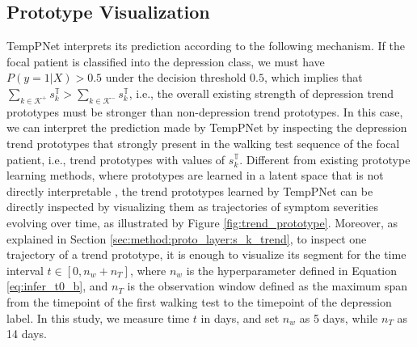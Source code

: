 \documentclass[mnsc]{informs3b} %
\begin{document}
\subsection{Prototype Visualization} \label{sec:method:proto_viz}

TempPNet interprets its prediction according to the following mechanism. If the focal patient is classified into the depression class, 
we must have $P(y=1|X) > 0.5$ under the decision threshold $0.5$, which implies that $\sum_{k \in \mathcal{K}^{+}} s_k^{\mathbb{T}} > \sum_{k \in \mathcal{K}^{-}} s_k^{\mathbb{T}}$, i.e., 
the overall existing strength of depression trend prototypes must be stronger than non-depression trend prototypes. 
In this case, we can interpret the prediction made by TempPNet by inspecting the depression trend prototypes that strongly present in the walking test sequence of the focal patient, i.e., trend prototypes with values of $s_k^{\mathbb{T}}$.
Different from existing prototype learning methods, where prototypes are learned in a latent space that is not directly interpretable \citep{chen_this_2019}, the trend prototypes learned by TempPNet can be directly inspected by visualizing them as trajectories of symptom severities evolving over time, as illustrated by Figure \ref{fig:trend_prototype}. Moreover, as explained in Section \ref{sec:method:proto_layer:s_k_trend}, to inspect one trajectory of a trend prototype, it is enough to visualize its segment for the time interval $t\in [0, n_w+n_T]$, where $n_w$ is the hyperparameter defined in Equation \ref{eq:infer_t0_b}, and $n_T$ is the observation window defined as the maximum span from the timepoint of the first walking test to the timepoint of the depression label. In this study, we measure time $t$ in days, and set $n_w$ as 5 days, while $n_T$ as 14 days.
\end{document}
